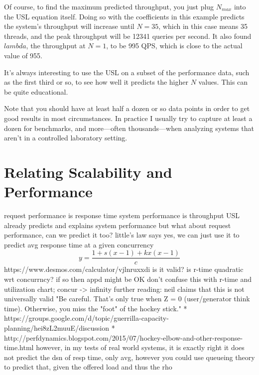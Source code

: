 \documentclass{vivid_layout}
\begin{document}
Of course, to find the maximum predicted throughput, you just plug $N_{max}$
into the USL equation itself. Doing so with the coefficients in this example
predicts the system's throughput will increase until $N=35$, which in this case
means 35 threads, and the peak throughput will be 12341 queries per second. It
also found $lambda$, the throughput at $N=1$, to be 995 QPS, which is close to
the actual value of 955.

It's always interesting to use the USL on a subset of the performance data, such
as the first third or so, to see how well it predicts the higher $N$ values.
This can be quite educational.

Note that you should have at least half a dozen or so data points in order to
get good results in most circumstances. In practice I usually try to capture at
least a dozen for benchmarks, and more---often thousands---when analyzing
systems that aren't in a controlled laboratory setting.

\section{Relating Scalability and Performance}



  request performance is response time
  system performance is throughput
  USL already predicts and explains system performance
  but what about request performance, can we predict it too?
	little's law says yes, we can
	just use it to predict avg response time at a given concurrency
	\[
	y=\frac{1+s(x-1)+kx(x-1)}{c}
	\]
	https://www.desmos.com/calculator/vjlnruxxdi
	is it valid? is r-time quadratic wrt concurrncy? if so then appd might be OK
	don't confuse this with r-time and utilization chart; concur -> infinity
	further reading: neil claims that this is not universally valid
	"Be careful. That's only true when Z = 0 (user/generator think time). 
	Otherwise, you miss the "foot" of the hockey stick."
 * https://groups.google.com/d/topic/guerrilla-capacity-planning/hei8zL2muuE/discussion
  * http://perfdynamics.blogspot.com/2015/07/hockey-elbow-and-other-response-time.html
  however, in my tests of real world systems, it is exactly right
  it does not predict the dsn of resp time, only avg, however you could use
  queueing theory to predict that, given the offered load and thus the rho
\end{document}
